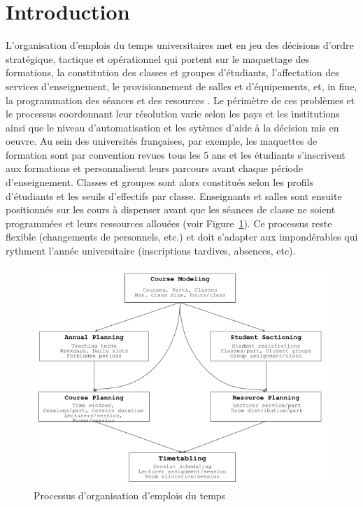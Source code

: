 \section{Introduction}
\label{sec:introduction}
L'organisation d'emplois du temps universitaires met en jeu des décisions d'ordre stratégique, tactique et opérationnel qui portent sur le maquettage des formations, la constitution des classes et groupes d'étudiants, l'affectation des services d'enseignement, le provisionnement de salles et d'équipements, et, in fine, la programmation des séances et des resources \cite{overview_uctp_2016_malaysian}.
Le périmètre de ces problèmes et le processus coordonnant leur résolution varie selon les pays et les institutions ainsi que le niveau d'automatisation et les sytèmes d'aide à la décision mis en oeuvre.
Au sein des universités françaises, par exemple, 
les maquettes de formation sont par convention revues tous les 5 ans et les étudiants s'inscrivent aux formations et personnalisent leurs parcours avant chaque période d'enseignement. 
Classes et groupes sont alors constitués selon les profils d'étudiants et les seuils d'effectifs par classe. 
Enseignants et salles sont ensuite positionnés sur les cours à dispenser avant que les séances de classe ne soient programmées et leurs ressources allouées (voir Figure~\ref{fig:utp-workflow}). 
Ce processus reste flexible (changements de personnels, etc.) et doit s'adapter aux impondérables qui rythment l'année universitaire (inscriptions tardives, absences, etc).

\begin{figure}[!t]
\begin{center}
\includegraphics[width=\columnwidth]{2022_PATAT/img/utp_workflow.png}
\end{center}
\caption{Processus d'organisation d'emplois du temps}%
\label{fig:utp-workflow}
\end{figure}

